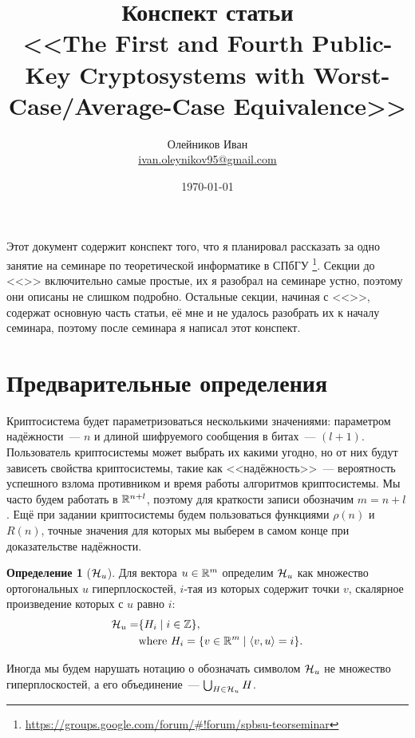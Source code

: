 \documentclass[oneside, a4paper]{article}
\theoremstyle{plain}
\theoremstyle{definition}
\newtheorem{defn}{Определение}
\theoremstyle{remark}
\newenvironment{definition}[1]{%
\begin{tcolorbox}[breakable,enhanced]
\begin{defn}[#1]
}{%
\end{defn}
\end{tcolorbox}
}
\newcommand\R{\ensuremath \mathbb R}
\newcommand\Z{\ensuremath \mathbb Z}
\newcommand\HH{\ensuremath \operatorname{\mathcal H}}
\DeclarePairedDelimiter\ang{\langle}{\rangle}
\begin{document}
\title{Конспект статьи \\ \foreignlanguage{english}{<<The First and Fourth Public-Key Cryptosystems
with Worst-Case/Average-Case Equivalence>>  \cite{ajtaidwork}}}
\author{Олейников Иван \\ \url{ivan.oleynikov95@gmail.com}}
\date{\today}
\maketitle

Этот документ содержит конспект того, что я планировал рассказать за одно занятие на семинаре по теоретической
информатике в СПбГУ \footnote{\url{https://groups.google.com/forum/\#!forum/spbsu-teorseminar}}. Секции до
<<>> включительно самые простые, их я разобрал на семинаре устно, поэтому они описаны не слишком
подробно. Остальные секции, начиная с <<>>, содержат основную часть статьи, её мне и не
удалось разобрать их к началу семинара, поэтому после семинара я написал этот конспект.

\tableofcontents

\section{Предварительные определения}
Криптосистема будет параметризоваться несколькими значениями: параметром надёжности~--- $n$ и длиной шифруемого сообщения
в битах~--- $(l+1)$. Пользователь криптосистемы может выбрать их какими угодно, но от них будут зависеть свойства
криптосистемы, такие как <<надёжность>>~--- вероятность успешного взлома противником и время работы алгоритмов
криптосистемы. Мы часто будем работать в $\R^{n+l}$, поэтому для краткости записи обозначим $m = n + l$. Ещё при задании
криптосистемы будем пользоваться функциями $\rho(n)$ и $R(n)$, точные значения для которых мы выберем в самом конце при
доказательстве надёжности.

\begin{definition}{$\HH_u$}
Для вектора $u \in \R^m$ определим $\HH_u$ как множество ортогональных $u$ гиперплоскостей, $i$-тая из которых содержит
точки $v$, скалярное произведение которых с $u$ равно $i$:
\[
\begin{aligned}
\HH_u = &\{H_i \mid i \in \Z \}, \\
&\text{where } H_i = \{v \in \R^m \mid \ang{v, u} = i\}.
\end{aligned}
\]

Иногда мы будем нарушать нотацию о обозначать символом $\HH_u$ не множество гиперплоскостей, а его объединение~---
$\bigcup_{H \in \HH_u} H$.
\end{definition}
\end{document}
